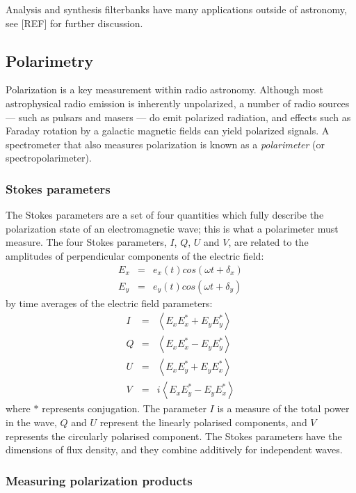 \documentclass{ws-rv961x669}
\begin{document}
Analysis and synthesis filterbanks have many applications outside of astronomy, see [REF] for further discussion.

\subsection{Polarimetry}

Polarization is a key measurement within radio astronomy.\citet{BookTinbergenPolarim}  Although most astrophysical radio emission is inherently unpolarized, a number of radio sources --- such as pulsars and masers --- do emit polarized radiation, and effects such as Faraday rotation by a galactic magnetic fields can yield polarized signals. A spectrometer that also measures polarization is known as a \emph{polarimeter} (or spectropolarimeter).

\subsubsection{Stokes parameters}

The Stokes parameters are a set of four quantities which fully describe the polarization state of an electromagnetic wave; this is what a polarimeter must measure. The four Stokes parameters, $I$, $Q$, $U$ and $V$, are related to the amplitudes of perpendicular components of the electric field:
\begin{eqnarray}
E_{x} & = & e_{x}(t)cos(\omega t+\delta_{x})\\
E_{y} & = & e_{y}(t)cos(\omega t+\delta_{y})
\end{eqnarray}
by time averages of the electric field parameters:
\begin{eqnarray}
I & = & \left\langle E_{x}E_{x}^{*}+E_{y}E_{y}^{*}\right\rangle \\
Q & = & \left\langle E_{x}E_{x}^{*}-E_{y}E_{y}^{*}\right\rangle \\
U & = & \left\langle E_{x}E_{y}^{*}+E_{y}E_{x}^{*}\right\rangle \\
V & = & i\left\langle E_{x}E_{y}^{*}-E_{y}E_{x}^{*}\right\rangle 
\end{eqnarray}
where $*$ represents conjugation. The parameter $I$ is a measure of the total power in the wave, $Q$ and $U$ represent the linearly polarised components, and $V$ represents the circularly polarised component. The Stokes parameters have the dimensions of flux density, and they combine additively for independent waves.

\subsubsection{Measuring polarization products}
\end{document}
